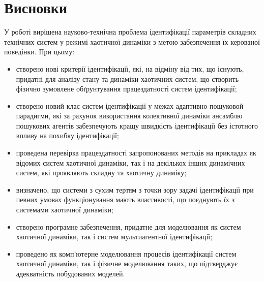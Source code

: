 \clearpage
{}
\chapter*{Висновки}


У роботі вирішена науково-технічна проблема ідентифікації параметрів складних технічних
систем у режимі хаотичної динаміки
з метою забезпечення їх керованої поведінки. При цьому:

\begin{itemize}

  \item
    створено нові критерії ідентифікації, які, на відміну від тих, що
    існують, придатні для аналізу стану та динаміки
    хаотичних систем, що створить фізично зумовлене обґрунтування працездатності систем
    ідентифікації;

  \item
    створено новий клас систем ідентифікації у межах
    адаптивно-пошуковой парадигми,
    які за рахунок використання колективної динаміки
    ансамблю пошукових агентів забезпечують
    кращу швидкість ідентифікації без істотного впливу на похибку ідентифікації;

  \item
    проведена перевірка працездатності запропонованих методів
    на прикладах як відомих систем хаотичної динаміки,
    так і на декількох інших динамічних систем, які проявляють
    складну та хаотичну динаміку;

  \item
   визначено, що системи з сухим тертям з точки зору задачі ідентифікації
   при певних  умовах функціонування
   мають властивості, що поєднують їх з системами хаотичної динаміки;

 \item
  створено програмне забезпечення, придатне для моделювання як систем
  хаотичної динаміки, так і систем мультиагентної ідентифікації;

  \item
  проведено як комп'ютерне моделювання процесів ідентифікації систем
  хаотичної динаміки, так і фізичне моделювання таких, що підтверджує адекватність
  побудованих моделей.

\end{itemize}

